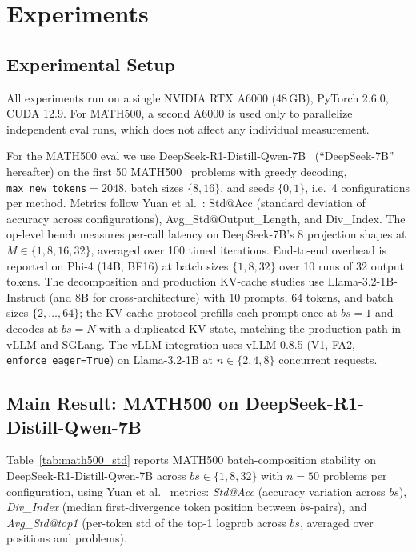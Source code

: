 \documentclass{article}
\begin{document}
\section{Experiments}
\label{sec:experiments}

\subsection{Experimental Setup}

All experiments run on a single NVIDIA RTX A6000 (48\,GB), PyTorch 2.6.0,
CUDA 12.9. For MATH500, a second A6000 is used only to parallelize
independent eval runs, which does not affect any individual measurement.

For the MATH500 eval we use DeepSeek-R1-Distill-Qwen-7B~\citep{deepseekr1}
(``DeepSeek-7B'' hereafter) on the first 50 MATH500~\citep{hendrycks2021math}
problems with greedy decoding, \texttt{max\_new\_tokens}$=2048$, batch sizes
$\{8,16\}$, and seeds $\{0,1\}$, i.e.\ 4 configurations per method. Metrics
follow Yuan et al.~\citep{yuan2025numerical}: Std@Acc (standard deviation of
accuracy across configurations), Avg\_Std@Output\_Length, and Div\_Index.
The op-level bench measures per-call latency on DeepSeek-7B's 8 projection
shapes at $M\!\in\!\{1,8,16,32\}$, averaged over 100 timed iterations.
End-to-end overhead is reported on Phi-4 (14B, BF16) at batch sizes
$\{1,8,32\}$ over 10 runs of 32 output tokens. The decomposition and
production KV-cache studies use Llama-3.2-1B-Instruct (and 8B for
cross-architecture) with 10 prompts, 64 tokens, and batch sizes
$\{2,\dots,64\}$; the KV-cache protocol prefills each prompt once at
$bs\!=\!1$ and decodes at $bs\!=\!N$ with a duplicated KV state, matching
the production path in vLLM and SGLang. The vLLM integration uses vLLM
0.8.5 (V1, FA2, \texttt{enforce\_eager=True}) on Llama-3.2-1B at
$n\!\in\!\{2,4,8\}$ concurrent requests.

\subsection{Main Result: MATH500 on DeepSeek-R1-Distill-Qwen-7B}
\label{sec:math500}

Table~\ref{tab:math500_std} reports MATH500 batch-composition stability
on DeepSeek-R1-Distill-Qwen-7B across $bs\in\{1,8,32\}$ with $n\!=\!50$
problems per configuration, using Yuan et al.~\citep{yuan2025numerical}
metrics: \emph{Std@Acc} (accuracy variation across $bs$), \emph{Div\_Index}
(median first-divergence token position between $bs$-pairs), and
\emph{Avg\_Std@top1} (per-token std of the top-1 logprob across $bs$,
averaged over positions and problems).
\end{document}
